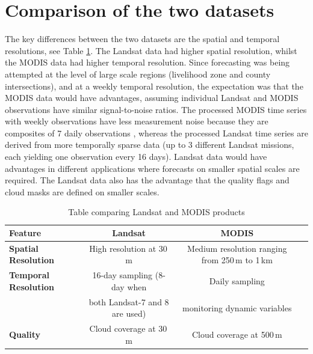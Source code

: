 \documentclass[review]{elsarticle}
\begin{document}

\appendix

\section{Comparison of the two datasets}\label{sec:datasets}
The key differences between the two datasets are the spatial and temporal resolutions, see Table \ref{tab:comp}. The Landsat data had higher spatial resolution, whilst the MODIS data had higher temporal resolution. Since forecasting was being attempted at the level of large scale regions (livelihood zone and county intersections), and at a weekly temporal resolution, the expectation was that the MODIS data would have advantages,  assuming individual Landsat and MODIS observations have similar signal-to-noise ratios. The processed MODIS time series with weekly observations have less measurement noise because they are composites of 7 daily observations , whereas the processed Landsat time series are derived from more temporally sparse data (up to 3 different Landsat missions, each yielding one observation every 16 days). Landsat data would have advantages in different applications where forecasts on smaller spatial scales are required. The Landsat data also has the advantage that the quality flags and cloud masks are defined on smaller scales.    



\begin{table}
	\small
	\caption{Table comparing Landsat and MODIS products}
	\label{tab:comp}
	\centering
	\begin{tabular}{lccc}
		\toprule
		\textbf{Feature}	& \textbf{Landsat} & \textbf{MODIS}\\
		\midrule
		\textbf{Spatial Resolution} & 	High resolution at 30\,m 	&   Medium resolution ranging from 250\,m to 1\,km \\
		\textbf{Temporal Resolution}	&  16-day sampling (8-day when	&   Daily sampling    \\ 
		&  both Landsat-7 and 8 are used) & monitoring dynamic variables \\
		\textbf{Quality} &Cloud coverage at 30\,m & Cloud coverage at 500\,m \\
		
		\bottomrule
	\end{tabular}
\end{table}
\end{document}
